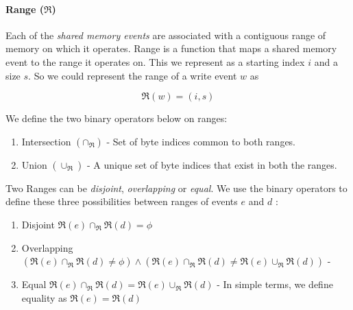  
        
        \paragraph{Range ($\Re$)}
            Each of the \textit{shared memory events} are associated with a contiguous range of memory on which it operates. Range is a function that maps a shared memory event to the range it operates on. This we represent as a starting index $i$ and a size $s$. So we could represent the range of a write event $w$ as 
                    
                    \[\Re(w) = (i, s) \]
        
           
            We define the two binary operators below on ranges: 
            \begin{enumerate}
                \item Intersection $(\cap{_\Re})$ - Set of byte indices common to both ranges.
                \item Union $(\cup_\Re)$ - A unique set of byte indices that exist in both the ranges.  
            \end{enumerate}
            
            Two Ranges can be \textit{disjoint}, \textit{overlapping} or \textit{equal}. We use the binary operators to define these three possibilities between ranges of events $e$ and $d$ :
            \begin{enumerate}
                \item Disjoint $\Re(e) \cap_\Re \Re(d) = \phi$ 
                \item Overlapping $(\Re(e)\cap_\Re \Re(d) \neq \phi) \wedge (\Re(e) \cap_\Re  \Re(d) \neq \Re(e) \cup_\Re \Re(d))$ - 
                \item Equal $\Re(e) \cap_\Re  \Re(d) = \Re(e) \cup_\Re \Re(d)$ - In simple terms, we define equality as $\Re(e) = \Re(d)$
            \end{enumerate}
            
